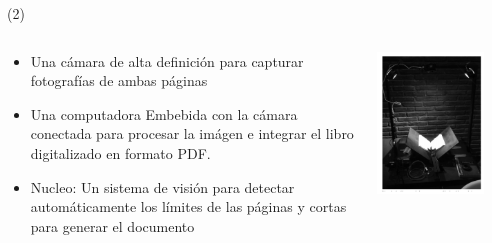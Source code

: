 \begin{frame}{ (2)}
\begin{columns}
\begin{column}{0.6\textwidth}
		\begin{itemize}
		\item Una cámara de alta definición para capturar fotografías de ambas páginas
		\item Una computadora Embebida con la cámara conectada para procesar la imágen e integrar el libro digitalizado en formato PDF.
		\item Nucleo: Un sistema de visión para detectar automáticamente los límites de las páginas y cortas para generar el documento
		\end{itemize}
\end{column}
\begin{column}{0.4\textwidth}  
    \begin{center}
     \includegraphics[width=0.8\textwidth]{Figs/BookScanner2}
     \end{center}
\end{column}
\end{columns}
\end{frame}


